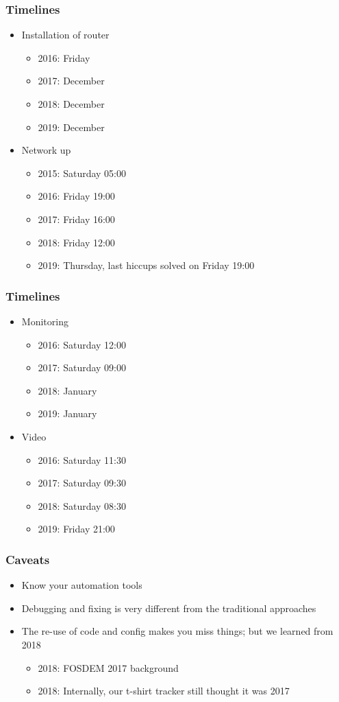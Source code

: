 \documentclass[aspectratio=169]{beamer}
\begin{document}
\begin{frame}
	\frametitle{Timelines}
	\vfill
	\begin{itemize}
		\item Installation of router
		\begin{itemize}
			\item 2016: Friday
			\item 2017: December
			\item 2018: December
			\item 2019: December
		\end{itemize}
		\item Network up
		\begin{itemize}
			\item 2015: Saturday 05:00
			\item 2016: Friday 19:00
			\item 2017: Friday 16:00
			\item 2018: Friday 12:00
			\item 2019: Thursday, last hiccups solved on Friday 19:00
		\end{itemize}
	\end{itemize}
	\vfill
\end{frame}

\begin{frame}
	\frametitle{Timelines}
	\begin{itemize}
	\vfill
		\item Monitoring
		\begin{itemize}
			\item 2016: Saturday 12:00
			\item 2017: Saturday 09:00
			\item 2018: January
			\item 2019: January
		\end{itemize}
		\item Video
		\begin{itemize}
			\item 2016: Saturday 11:30
			\item 2017: Saturday 09:30
			\item 2018: Saturday 08:30
			\item 2019: Friday 21:00
		\end{itemize}
	\end{itemize}
	\vfill
\end{frame}


\begin{frame}
	\frametitle{Caveats}
	\vfill
	\begin{itemize}
		\item Know your automation tools
		\item Debugging and fixing is very different from the traditional approaches
		\item The re-use of code and config makes you miss things; but we learned from 2018
		\begin{itemize}
			\item 2018: FOSDEM 2017 background
			\item 2018: Internally, our t-shirt tracker still thought it was 2017
		\end{itemize}
	\end{itemize}
	\vfill
\end{frame}
\end{document}
